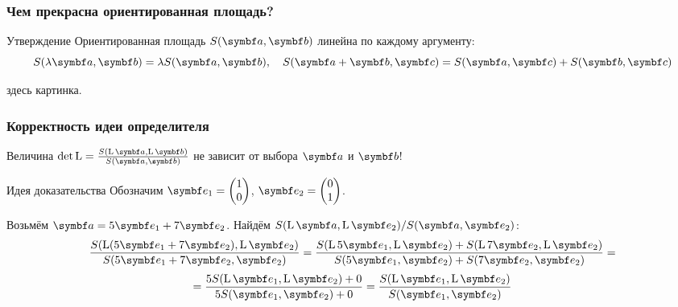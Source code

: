 \begin{frame}
    \frametitle{Чем прекрасна ориентированная площадь?}

    \begin{block}{Утверждение}
        Ориентированная площадь $S(\ba, \bb)$ линейна по каждому аргументу:
        \[
        S(\lambda \ba, \bb) = \lambda S(\ba, \bb), \quad S(\ba + \bb, \bc) = S(\ba, \bc) + S(\bb, \bc)    
        \]
    \end{block}

    \pause

    здесь картинка.

    

\end{frame}



\begin{frame}
    \frametitle{Корректность идеи определителя}

    Величина $\det \LL = \frac{S(\LL\ba, \LL\bb)}{S(\ba, \bb)}$ не зависит от выбора $\ba$ и $\bb$!


    \pause
    \begin{block}{Идея доказательства}
        Обозначим $\be_1 = \begin{pmatrix}
            1 \\
            0 \\
        \end{pmatrix}$, $\be_2 = \begin{pmatrix}
            0 \\
            1 \\
        \end{pmatrix}$.
        \pause

        Возьмём $\ba = 5\be_1 + 7\be_2$. Найдём $S(\LL\ba, \LL\be_2)/{S(\ba, \be_2)}$:
        \pause
        \[
        \frac{S(\LL (5\be_1 + 7\be_2), \LL \be_2)}{S(5\be_1 + 7\be_2,\be_2)} =
         \frac{S(\LL 5\be_1 , \LL \be_2) + S(\LL 7\be_2 , \LL \be_2)}{S(5\be_1,\be_2) + S(7\be_2,\be_2)} =
        \]
        \pause
        \[
         =\frac{5S(\LL \be_1 , \LL \be_2) + 0}{5S(\be_1,\be_2) + 0} =
         \frac{S(\LL \be_1 , \LL \be_2)}{S(\be_1,\be_2)}
        \]
    \end{block}

    

\end{frame}



